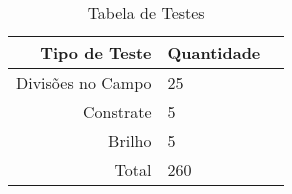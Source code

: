 	
\begin{table}[h]
\centering
\caption{Tabela de Testes}
\begin{tabular}{r|lr}
Tipo de Teste & Quantidade \\ %
\hline                               %
Divisões no Campo        & 25 \\
Constrate  & 5\\
Brilho            & 5 \\
\hline  
Total & 260
 
\end{tabular}
\end{table}
